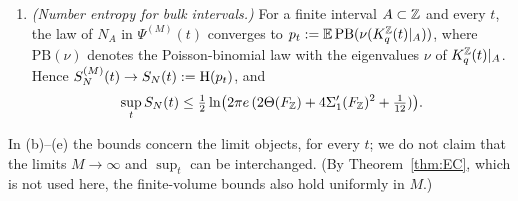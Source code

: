 \begin{theorem}
\begin{enumerate}[label=(\alph*)]
for definite-charge initial states $\ket{\xi}_\sigma\otimes\ket{n|_{\Lambda_M}}$ with $\xi$ uniform.
\item \emph{(Number entropy for bulk intervals.)}  For a finite interval $A\subset\mathbb{Z}$ and every $t$, the law of $N_A$
in $\Psi^{(M)}(t)$ converges to $p_t:=\mathbb{E}\,\mathrm{PB}(\nu(K^{\mathbb{Z}}_q(t)|_A))$, where $\mathrm{PB}(\nu)$ denotes the
Poisson-binomial law with the eigenvalues $\nu$ of $K^{\mathbb{Z}}_q(t)|_A$.  Hence $S_{N}^{(M)}(t)\to S_{N}(t):=\mathrm{H}(p_t)$, and
\[
  \sup_tS_{N}(t)\le\tfrac12\ln\bigl(2\pi e\,(2\Theta(F_{\mathbb{Z}})+4\Sigma_1'(F_{\mathbb{Z}})^2+\tfrac1{12})\bigr).
\]
\end{enumerate}
In (b)--(e) the bounds concern the limit objects, for every $t$; we do not claim that the limits $M\to\infty$ and
$\sup_t$ can be interchanged.  (By Theorem~\ref{thm:EC}, which is not used here, the finite-volume bounds also hold
uniformly in $M$.)
\end{theorem}

